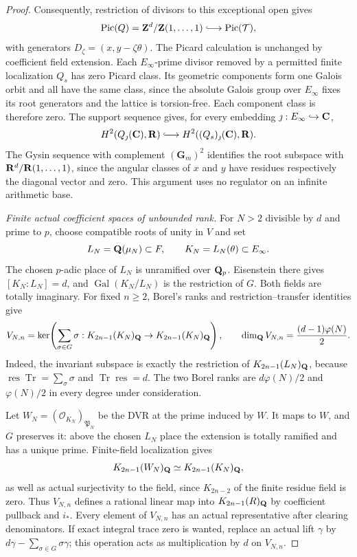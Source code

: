 \begin{proof}
Consequently, restriction of divisors to this exceptional open
gives
\[
 \Pic(Q)=\Z^d/\Z(1,\ldots,1)
       \lhook\joinrel\longrightarrow\Pic(\mathcal T),
\]
with generators $D_\zeta=(x,y-\zeta\theta)$.
The Picard calculation is unchanged by coefficient field
extension. Each $E_\infty$-prime divisor removed by a permitted
finite localization $Q_s$ has zero Picard class. Its geometric
components form one Galois orbit and all have the same class,
since the absolute Galois group over $E_\infty$ fixes its root
generators and the lattice is
torsion-free. Each component class is therefore zero.
The support sequence gives, for every embedding
$\jmath:E_\infty\hookrightarrow\mathbf C$,
\begin{equation}
 H^2(Q_\jmath(\C),\R)
      \lhook\joinrel\longrightarrow H^2((Q_s)_\jmath(\C),\R).
 \label{d2ext:strictcoefficientbetti}
\end{equation}
The Gysin sequence with complement $(\mathbf G_m)^2$ identifies
the root subspace with $\mathbf R^d/\mathbf R(1,\ldots,1)$, since the
angular classes of $x$ and $y$ have residues respectively the
diagonal vector and zero. This argument uses no regulator on
an infinite arithmetic base.

\emph{Finite actual coefficient spaces of unbounded rank.}
For $N>2$ divisible by $d$ and prime to $p$, choose compatible
roots of unity in $V$ and set
\[
 L_N=\mathbf Q(\mu_N)\subset F,\qquad K_N=L_N(\theta)\subset E_\infty .
\]
The chosen $p$-adic place of $L_N$ is unramified over $\mathbf Q_p$.
Eisenstein there gives $[K_N:L_N]=d$, and
$\operatorname{Gal}(K_N/L_N)$ is the restriction of $G$. Both fields
are totally imaginary. For fixed $n\ge2$, Borel's ranks
\cite[Proposition~12.2]{Borel} and restriction--transfer identities give
\begin{equation}
 V_{N,n}=
 \ker\!\left(\sum_{\sigma\in G}\sigma:
       K_{2n-1}(K_N)_{\mathbf Q}\to K_{2n-1}(K_N)_{\mathbf Q}\right),
 \qquad
 \dim_{\mathbf Q}V_{N,n}=\frac{(d-1)\varphi(N)}2.
 \label{d2ext:strictcoefficientrank}
\end{equation}
Indeed, the invariant subspace is exactly the restriction of
$K_{2n-1}(L_N)_{\mathbf Q}$, because
$\operatorname{res}\operatorname{Tr}=\sum_\sigma\sigma$ and
$\operatorname{Tr}\operatorname{res}=d$.
The two Borel ranks are $d\varphi(N)/2$ and $\varphi(N)/2$
in every degree under consideration.

Let $W_N=(\mathcal O_{K_N})_{\mathfrak P_N}$ be the DVR
at the prime induced by $W$. It maps to $W$, and $G$ preserves
it: above the chosen $L_N$ place the extension is totally
ramified and has a unique prime. Finite-field localization
gives
\[
 K_{2n-1}(W_N)_{\mathbf Q}\simeq K_{2n-1}(K_N)_{\mathbf Q},
\]
as well as actual surjectivity to the field, since
$K_{2n-2}$ of the finite residue field is zero.
Thus $V_{N,n}$ defines a rational linear map into
$K_{2n-1}(R)_{\mathbf Q}$ by coefficient pullback and $i_*$.
Every element of $V_{N,n}$ has an actual representative after clearing
denominators. If exact integral trace zero is wanted, replace
an actual lift $\gamma$ by
$d\gamma-\sum_{\sigma\in G}\sigma\gamma$; this operation
acts as multiplication by $d$ on $V_{N,n}$.


\end{proof}
